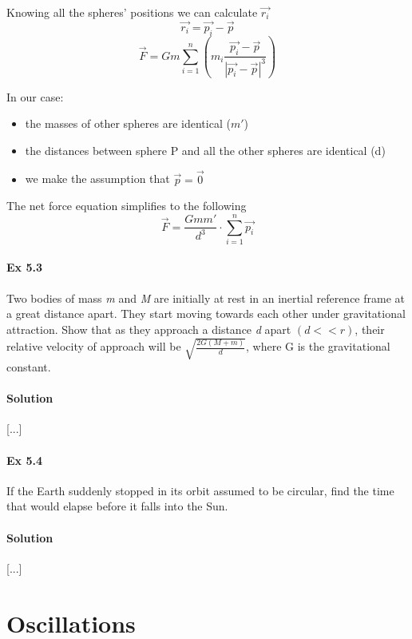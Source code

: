 \documentclass{article}
\begin{document}
Knowing all the spheres' positions we can calculate $\vec{r_i}$
\[ \vec{r_i} = \vec{p_i} - \vec{p} \]
\[ \vec{F} = Gm \sum_{i=1}^{n} \left( m_i \frac{\vec{p_i} - \vec{p}}{|\vec{p_i} - \vec{p}|^3} \right) \]

In our case:
\begin{itemize}
    \item the masses of other spheres are identical ($m'$)
    \item the distances between sphere P and all the other spheres are identical (d)
    \item we make the assumption that $\vec{p} = \vec{0}$
\end{itemize}
The net force equation simplifies to the following
\[ \vec{F} = \frac{Gmm'}{d^3} \cdot \sum_{i=1}^{n} \vec{p_i} \]


\paragraph{Ex 5.3}
Two bodies of mass \textit{m} and \textit{M} are initially at rest in an inertial reference frame at a great distance apart. They start moving towards each other under gravitational attraction. Show that as they approach a distance \textit{d} apart $(d << r)$, their relative velocity of approach will be $\sqrt{\frac{2G(M + m)}{d}}$, where G is the gravitational constant.
\paragraph{Solution}

[...]


\paragraph{Ex 5.4}
If the Earth suddenly stopped in its orbit assumed to be circular, find the time that would elapse before it falls into the Sun.
\paragraph{Solution}

[...]


\section{Oscillations}
\end{document}
